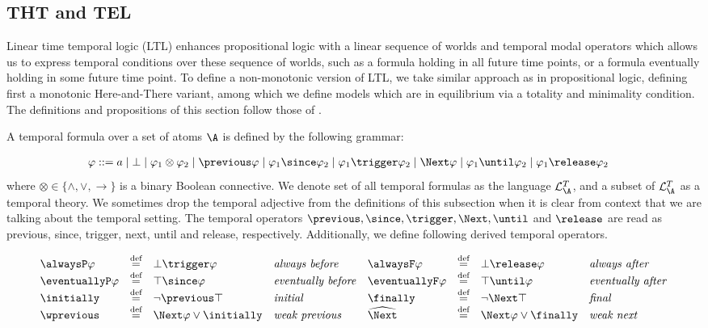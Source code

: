 \subsection{THT and TEL}

Linear time temporal logic (LTL) enhances propositional logic with a
linear sequence of worlds and temporal modal operators which allows us
to express temporal conditions over these sequence of worlds, such as
a formula holding in all future time points, or a formula eventually
holding in some future time point. To define a non-monotonic version
of LTL, we take similar approach as in propositional logic, defining
first a monotonic Here-and-There variant, among which we define models
which are in equilibrium via a totality and minimality condition. The
definitions and propositions of this section follow those of
\cite{agcadipescscvi20a}.

A temporal formula over a set of atoms $\A$ is defined by the
following grammar:

\begin{align*}
    \varphi ::= &\; a \mid \bot \mid
                  \varphi_1 \otimes \varphi_2 \mid
                  \previous \varphi \mid \varphi_1 \since \varphi_2 \mid \varphi_1 \trigger \varphi_2 \mid
                  \Next \varphi \mid \varphi_1 \until \varphi_2 \mid \varphi_1 \release \varphi_2             
\end{align*}
where $\otimes \in \{ \wedge, \vee, \to \}$ is a binary Boolean
connective. We denote set of all temporal formulas as the language
$\mathcal{L}_{\A}^{T}$, and a subset of $\mathcal{L}_{\A}^{T}$ as a
temporal theory. We sometimes drop the temporal adjective from the
definitions of this subsection when it is clear from context that we
are talking about the temporal setting. The temporal operators
$\previous, \since, \trigger, \Next, \until$ and $\release$ are read as
previous, since, trigger, next, until and release,
respectively. Additionally, we define following derived temporal
operators.

\[
\begin{array}{l l l l l l l l}
\alwaysP \varphi & \defeq & \bot \trigger \varphi & \text{\emph{always before}} &
\alwaysF \varphi & \defeq & \bot \release \varphi & \text{\emph{always after}} \\
\eventuallyP \varphi & \defeq & \top \since \varphi & \text{\emph{eventually before}} &
\eventuallyF \varphi & \defeq & \top \until \varphi & \text{\emph{eventually after}} \\
\initially & \defeq & \lnot \previous \top & \text{\emph{initial}} &
\finally & \defeq & \lnot \Next \top & \text{\emph{final}} \\
\wprevious & \defeq & \Next \varphi \vee \initially & \text{\emph{weak previous}} &
\wnext & \defeq & \Next \varphi \vee \finally & \text{\emph{weak next}}
\end{array}
\]

